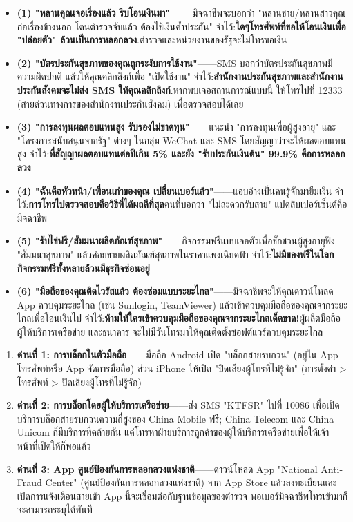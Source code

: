 \begin{itemize}
  \item \textbf{(1) "หลานคุณเจอเรื่องแล้ว รีบโอนเงินมา"}—— มิจฉาชีพจะบอกว่า "หลานชาย/หลานสาวคุณก่อเรื่องข้างนอก โดนตำรวจจับแล้ว ต้องใช้เงินค้ำประกัน" จำไว้:\textbf{ใดๆโทรศัพท์ที่ขอให้โอนเงินเพื่อ "ปล่อยตัว" ล้วนเป็นการหลอกลวง}.ตำรวจและหน่วยงานของรัฐจะไม่โทรขอเงิน
  \item \textbf{(2) "บัตรประกันสุขภาพของคุณถูกระงับการใช้งาน"}——SMS บอกว่าบัตรประกันสุขภาพมีความผิดปกติ แล้วให้คุณคลิกลิงก์เพื่อ "เปิดใช้งาน" จำไว้:\textbf{สำนักงานประกันสุขภาพและสำนักงานประกันสังคมจะไม่ส่ง SMS ให้คุณคลิกลิงก์}.หากพบเจอสถานการณ์แบบนี้ ให้โทรไปที่ 12333 (สายด่วนทางการของสำนักงานประกันสังคม) เพื่อตรวจสอบได้เลย
  \item \textbf{(3) "การลงทุนผลตอบแทนสูง รับรองไม่ขาดทุน"}——แนะนำ "การลงทุนเพื่อผู้สูงอายุ" และ "โครงการสนับสนุนจากรัฐ" ต่างๆ ในกลุ่ม WeChat และ SMS โดยสัญญาว่าจะให้ผลตอบแทนสูง จำไว้:\textbf{ที่สัญญาผลตอบแทนต่อปีเกิน 5\% และยัง "รับประกันเงินต้น" 99.9\% คือการหลอกลวง}
  \item \textbf{(4) "ฉันคือหัวหน้า/เพื่อนเก่าของคุณ เปลี่ยนเบอร์แล้ว"}——แอบอ้างเป็นคนรู้จักมายืมเงิน จำไว้:\textbf{การโทรไปตรวจสอบคือวิธีที่ได้ผลดีที่สุด}คนที่บอกว่า "ไม่สะดวกรับสาย" แปดสิบเปอร์เซ็นต์คือมิจฉาชีพ
  \item \textbf{(5) "รับไข่ฟรี/สัมมนาผลิตภัณฑ์สุขภาพ"}——กิจกรรมฟรีแบบเจอตัวเพื่อชักชวนผู้สูงอายุฟัง "สัมมนาสุขภาพ" แล้วค่อยขายผลิตภัณฑ์สุขภาพในราคาแพงเฉียดฟ้า จำไว้:\textbf{ไม่มีของฟรีในโลก กิจกรรมฟรีทั้งหลายล้วนมีธุรกิจซ่อนอยู่}
  \item \textbf{(6) "มือถือของคุณติดไวรัสแล้ว ต้องซ่อมแบบระยะไกล"}——มิจฉาชีพจะให้คุณดาวน์โหลด App ควบคุมระยะไกล (เช่น Sunlogin, TeamViewer) แล้วเข้าควบคุมมือถือของคุณจากระยะไกลเพื่อโอนเงินไป จำไว้:\textbf{ห้ามให้ใครเข้าควบคุมมือถือของคุณจากระยะไกลเด็ดขาด!}ผู้ผลิตมือถือ ผู้ให้บริการเครือข่าย และธนาคาร จะไม่มีวันโทรมาให้คุณติดตั้งซอฟต์แวร์ควบคุมระยะไกล
\end{itemize}


\begin{enumerate}
  \item \textbf{ด่านที่ 1: การบล็อกในตัวมือถือ}——มือถือ Android เปิด "บล็อกสายรบกวน" (อยู่ใน App โทรศัพท์หรือ App จัดการมือถือ) ส่วน iPhone ให้เปิด "ปิดเสียงผู้โทรที่ไม่รู้จัก" (การตั้งค่า > โทรศัพท์ > ปิดเสียงผู้โทรที่ไม่รู้จัก)
  \item \textbf{ด่านที่ 2: การบล็อกโดยผู้ให้บริการเครือข่าย}——ส่ง SMS "KTFSR" ไปที่ 10086 เพื่อเปิดบริการบล็อกสายรบกวนความถี่สูงของ China Mobile ฟรี; China Telecom และ China Unicom ก็มีบริการที่คล้ายกัน แค่โทรหาฝ่ายบริการลูกค้าของผู้ให้บริการเครือข่ายเพื่อให้เจ้าหน้าที่เปิดให้ก็พอแล้ว
  \item \textbf{ด่านที่ 3: App ศูนย์ป้องกันการหลอกลวงแห่งชาติ}——ดาวน์โหลด App "National Anti-Fraud Center" (ศูนย์ป้องกันการหลอกลวงแห่งชาติ) จาก App Store แล้วลงทะเบียนและเปิดการแจ้งเตือนสายเข้า App นี้จะเชื่อมต่อกับฐานข้อมูลของตำรวจ พอเบอร์มิจฉาชีพโทรเข้ามาก็จะสามารถระบุได้ทันที
\end{enumerate}

